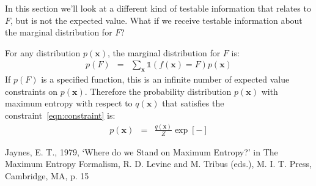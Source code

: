 \documentclass[letterpaper, 11pt]{article}
\newcommand{\xx}{\boldsymbol{x}}
\begin{document}
In this section we'll look at a different kind of testable information that
relates to $F$, but is not the expected value. What if we receive testable
information about the marginal distribution for $F$?

For any distribution $p(\xx)$, the marginal distribution for $F$ is:
\begin{eqnarray}
p(F) &=& \sum_{\xx}\mathds{1}\left(f(\xx) = F\right)p(\xx)\label{eqn:constraint}
\end{eqnarray}
If $p(F)$ is a specified function, this is an infinite number of expected
value constraints on $p(\xx)$. Therefore the probability distribution
$p(\xx)$ with maximum entropy with respect to $q(\xx)$ that satisfies the
constraint~\ref{eqn:constraint} is:
\begin{eqnarray}
p(\xx) &=& \frac{q(\xx)}{Z}\exp\left[- \right]
\end{eqnarray}





\begin{thebibliography}{}
Jaynes, E. T., 1979, `Where do we Stand on Maximum Entropy?' in The Maximum Entropy Formalism, R. D. Levine and M. Tribus (eds.), M. I. T. Press, Cambridge, MA, p. 15
\end{thebibliography}
\end{document}
